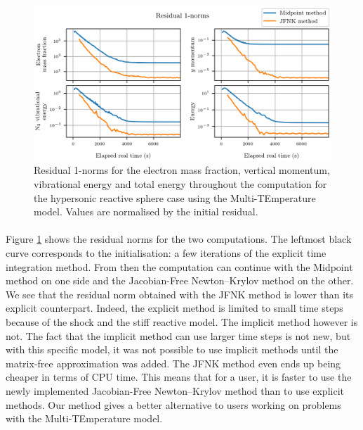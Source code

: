         \begin{figure}
          \centering
          \includegraphics{figures/sphere_mte_residuals.png}
          \caption{Residual 1-norms for the electron mass fraction, vertical momentum,  vibrational energy and total energy throughout the computation for the hypersonic reactive sphere case using the Multi-TEmperature model.
          Values are normalised by the initial residual.}
          \label{fig:sphere_mte_residuals}
        \end{figure}

        \paragraph{}
        Figure \ref{fig:sphere_mte_residuals} shows the residual norms for the two computations.
        The leftmost black curve corresponds to the initialisation: a few iterations of the explicit time integration method.
        From then the computation can continue with the Midpoint method on one side and the Jacobian-Free Newton--Krylov method on the other.
        We see that the residual norm obtained with the JFNK method is lower than its explicit counterpart.
        Indeed, the explicit method is limited to small time steps because of the shock and the stiff reactive model.
        The implicit method however is not.
        The fact that the implicit method can use larger time steps is not new, but with this specific model, it was not possible to use implicit methods until the matrix-free approximation was added.
        The JFNK method even ends up being cheaper in terms of CPU time.
        This means that for a user, it is faster to use the newly implemented Jacobian-Free Newton--Krylov method than to use explicit methods.
        Our method gives a better alternative to users working on problems with the Multi-TEmperature model.


